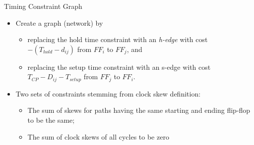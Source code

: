 \documentclass[10pt,ignorenonframetext,mathserif]{beamer}
\providecommand{\tightlist}{%
  \setlength{\itemsep}{0pt}\setlength{\parskip}{0pt}}
\begin{document}
\begin{frame}{Timing Constraint Graph}

\begin{itemize}
\tightlist
\item
  Create a graph (network) by

  \begin{itemize}
  \tightlist
  \item
    replacing the hold time constraint with an \emph{h-edge} with cost
    \(-(T_{hold} - d_{ij})\) from \(FF_i\) to \(FF_j\), and
  \item
    replacing the setup time constraint with an s-edge with cost
    \(T_{CP} - D_{ij} - T_{setup}\) from \(FF_j\) to \(FF_i\).
  \end{itemize}
\item
  Two sets of constraints stemming from clock skew definition:

  \begin{itemize}
  \tightlist
  \item
    The sum of skews for paths having the same starting and ending
    flip-flop to be the same;
  \item
    The sum of clock skews of all cycles to be zero
  \end{itemize}
\end{itemize}

\end{frame}
\end{document}
